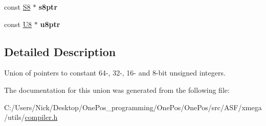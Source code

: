 \begin{DoxyCompactItemize}
\item 
\hypertarget{union_union_c_ptr_a579611a0e96c69ba201c64f5dd2ac402}{const \hyperlink{group__group__xmega__utils_gaf1475a0bb1962ef08dd1f78bd5dba87a}{S8} $\ast$ {\bfseries s8ptr}}\label{union_union_c_ptr_a579611a0e96c69ba201c64f5dd2ac402}

\item 
\hypertarget{union_union_c_ptr_ac9d23d7f791de03f4352e2e7f8f31601}{const \hyperlink{group__group__xmega__utils_gaa63ef7b996d5487ce35a5a66601f3e73}{U8} $\ast$ {\bfseries u8ptr}}\label{union_union_c_ptr_ac9d23d7f791de03f4352e2e7f8f31601}

\end{DoxyCompactItemize}


\subsection{Detailed Description}
Union of pointers to constant 64-\/, 32-\/, 16-\/ and 8-\/bit unsigned integers. 

The documentation for this union was generated from the following file\-:\begin{DoxyCompactItemize}
\item 
C\-:/\-Users/\-Nick/\-Desktop/\-One\-Pos\-\_\-programming/\-One\-Pos/\-One\-Pos/src/\-A\-S\-F/xmega/utils/\hyperlink{compiler_8h}{compiler.\-h}\end{DoxyCompactItemize}
